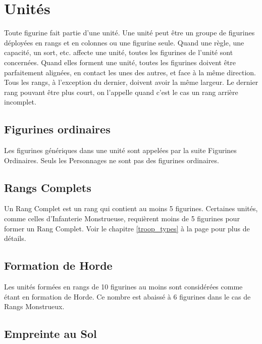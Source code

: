 \section{Unités}

Toute figurine fait partie d'une unité. Une unité peut être un groupe de figurines déployées en rangs et en colonnes ou une figurine seule. Quand une règle, une capacité, un sort, etc. affecte une unité, toutes les figurines de l'unité sont concernées. Quand elles forment une unité, toutes les figurines doivent être parfaitement alignées, en contact les unes des autres, et face à la même direction. Tous les rangs, à l'exception du dernier, doivent avoir la même largeur. Le dernier rang pouvant être plus court, on l'appelle quand c'est le cas un rang arrière incomplet. 

\subsection{Figurines ordinaires}

Les figurines génériques dans une unité sont appelées par la suite Figurines Ordinaires. Seuls les Personnages ne sont pas des figurines ordinaires.

\subsection{Rangs Complets}

Un Rang Complet est un rang qui contient au moins 5 figurines. Certaines unités, comme celles d'Infanterie Monstrueuse, requièrent moins de 5 figurines pour former un Rang Complet. Voir le chapitre \ref{troop_types} à la page \pageref{troop_types} pour plus de détails.

\subsection{Formation de Horde}
\label{horde}

Les unités formées en rangs de 10 figurines au moins sont considérées comme étant en formation de Horde. Ce nombre est abaissé à 6 figurines dans le cas de Rangs Monstrueux.

\subsection{Empreinte au Sol}


